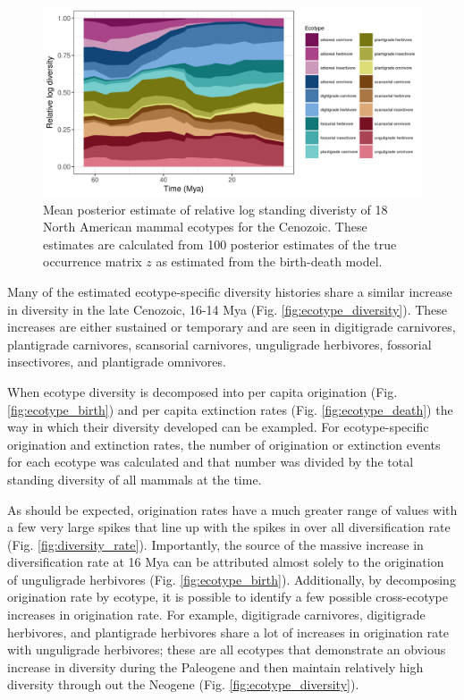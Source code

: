 \documentclass[12pt,letterpaper]{article}
\begin{document}
\begin{figure}[ht]
  \centering
  \includegraphics[width=\textwidth,height=0.4\textheight,keepaspectratio=true]{figure/relative_diversity}
  \caption[Relative mammal ecotype log-diversity for the Cenozoic]{Mean posterior estimate of relative log standing diveristy of 18 North American mammal ecotypes for the Cenozoic. These estimates are calculated from 100 posterior estimates of the true occurrence matrix \(z\) as estimated from the birth-death model.}
  \label{fig:ecotype_relative}
\end{figure}


Many of the estimated ecotype-specific diversity histories share a similar increase in diversity in the late Cenozoic, 16-14 Mya (Fig. \ref{fig:ecotype_diversity}). These increases are either sustained or temporary and are seen in digitigrade carnivores, plantigrade carnivores, scansorial carnivores, unguligrade herbivores, fossorial insectivores, and plantigrade omnivores.

When ecotype diversity is decomposed into per capita origination (Fig. \ref{fig:ecotype_birth}) and per capita extinction rates (Fig. \ref{fig:ecotype_death}) the way in which their diversity developed can be exampled. For ecotype-specific origination and extinction rates, the number of origination or extinction events for each ecotype was calculated and that number was divided by the total standing diversity of all mammals at the time. 

As should be expected, origination rates have a much greater range of values with a few very large spikes that line up with the spikes in over all diversification rate (Fig. \ref{fig:diversity_rate}). Importantly, the source of the massive increase in diversification rate at 16 Mya can be attributed almost solely to the origination of unguligrade herbivores (Fig. \ref{fig:ecotype_birth}). Additionally, by decomposing origination rate by ecotype, it is possible to identify a few possible cross-ecotype increases in origination rate. For example, digitigrade carnivores, digitigrade herbivores, and plantigrade herbivores share a lot of increases in origination rate with unguligrade herbivores; these are all ecotypes that demonstrate an obvious increase in diversity during the Paleogene and then maintain relatively high diversity through out the Neogene (Fig. \ref{fig:ecotype_diversity}).
\end{document}
